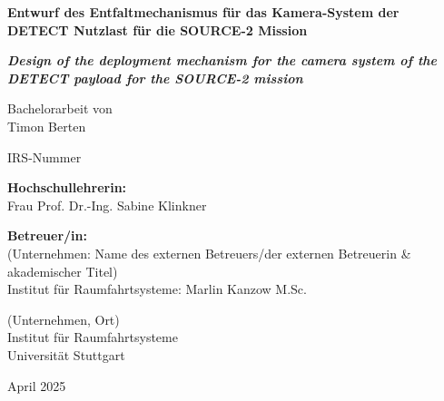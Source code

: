 \documentclass[11pt,ngerman,open=right,twoside=true]{scrbook}
\begin{document}
\thispagestyle{empty}

\vspace*{23mm}
\hspace{30mm}%
\begin{minipage}[c][67mm]{117mm}%
\begin{center}
	\textbf{\Large{}Entwurf des Entfaltmechanismus für das Kamera-System der DETECT Nutzlast für die SOURCE-2 Mission}{\Large\par}
	\par\end{center}
\begin{center}
	\textbf{\textit{\Large{Design of the deployment mechanism for the camera system of the DETECT payload for the SOURCE-2 mission}}}{\Large\par}
	\par\end{center}
\begin{center}
Bachelorarbeit von\\
Timon Berten
\par\end{center}
\begin{center}
IRS-Nummer
\par\end{center}%
\end{minipage}

\vspace*{3.5cm}

\hspace{30mm}%
\begin{minipage}[c]{117mm}%
\begin{center}
\textbf{\small{}Hochschullehrerin:}{\small{}}\\
{\small{}Frau Prof. Dr.-Ing. Sabine Klinkner}{\small\par}
\par\end{center}
\begin{center}
\textbf{\small{}Betreuer/in:}{\small{}}\\
{\small{}(Unternehmen: Name des externen Betreuers/der externen Betreuerin \& akademischer Titel)}\\
{\small{}Institut für Raumfahrtsysteme: Marlin Kanzow M.Sc.}\\
{\small{}\vspace*{3.5cm}}{\small\par}
\par\end{center}
\begin{center}
(Unternehmen, Ort) \\
Institut für Raumfahrtsysteme\\
Universität Stuttgart
\par\end{center}
\begin{center}
April 2025
\par\end{center}%
\end{minipage}
\newpage{}
\end{document}
